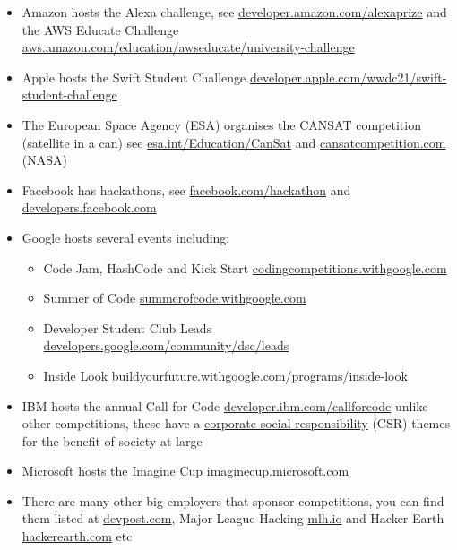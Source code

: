 \documentclass[
]{book}
\providecommand{\tightlist}{%
  \setlength{\itemsep}{0pt}\setlength{\parskip}{0pt}}
\begin{document}
\begin{itemize}
\tightlist
\item
  Amazon hosts the Alexa challenge, see \href{https://developer.amazon.com/alexaprize/challenges/current-challenge/rules}{developer.amazon.com/alexaprize} and the AWS Educate Challenge \href{https://aws.amazon.com/education/awseducate/university-challenge/}{aws.amazon.com/education/awseducate/university-challenge}
\item
  Apple hosts the Swift Student Challenge \href{https://developer.apple.com/wwdc21/swift-student-challenge/}{developer.apple.com/wwdc21/swift-student-challenge}
\item
  The European Space Agency (ESA) organises the CANSAT competition (satellite in a can) see \href{https://www.esa.int/Education/CanSat}{esa.int/Education/CanSat} and \href{http://www.cansatcompetition.com/}{cansatcompetition.com} (NASA)
\item
  Facebook has hackathons, see \href{https://en-gb.facebook.com/hackathon}{facebook.com/hackathon} and \href{https://developers.facebook.com/}{developers.facebook.com}
\item
  Google hosts several events including:

  \begin{itemize}
  \tightlist
  \item
    Code Jam, HashCode and Kick Start \href{https://codingcompetitions.withgoogle.com/}{codingcompetitions.withgoogle.com}
  \item
    Summer of Code \href{https://summerofcode.withgoogle.com/}{summerofcode.withgoogle.com} \citep{gsoc}
  \item
    Developer Student Club Leads \href{https://developers.google.com/community/dsc/leads}{developers.google.com/community/dsc/leads}
  \item
    Inside Look \href{https://buildyourfuture.withgoogle.com/programs/inside-look/}{buildyourfuture.withgoogle.com/programs/inside-look}
  \end{itemize}
\item
  IBM hosts the annual Call for Code \href{https://developer.ibm.com/callforcode}{developer.ibm.com/callforcode} unlike other competitions, these have a \href{https://en.wikipedia.org/wiki/Corporate_social_responsibility}{corporate social responsibility} (CSR) themes for the benefit of society at large
\item
  Microsoft hosts the Imagine Cup \href{https://imaginecup.microsoft.com/}{imaginecup.microsoft.com}
\item
  There are many other big employers that sponsor competitions, you can find them listed at \href{https://devpost.com}{devpost.com}, Major League Hacking \href{https://mlh.io/}{mlh.io} and Hacker Earth \href{https://www.hackerearth.com/}{hackerearth.com} etc
\end{itemize}
\end{document}
